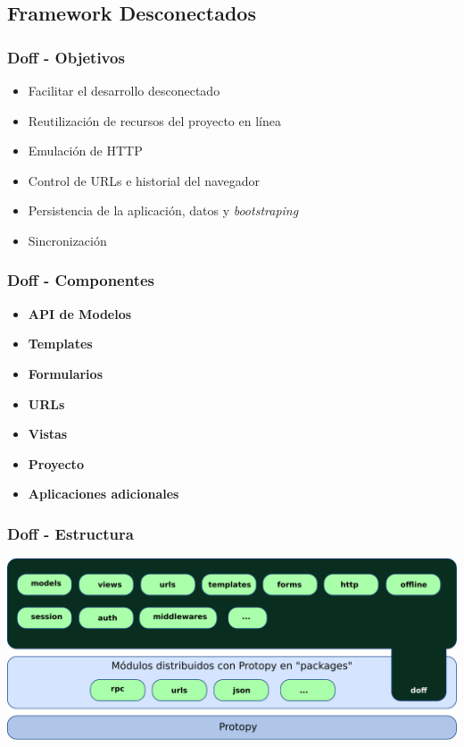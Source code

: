 \documentclass{beamer}
\begin{document}
\subsection{Framework Desconectados}
\begin{frame}
    \frametitle{Doff - Objetivos}
    \begin{itemize}
        \item{Facilitar el desarrollo desconectado}
        \item{Reutilización de recursos del proyecto en línea}
        \item{Emulación de HTTP}
        \item{Control de URLs e historial del navegador}
        \item{Persistencia de la aplicación, datos y {\it bootstraping}}
        \item{Sincronización}
        \end{itemize}
\end{frame}
    

\begin{frame}
    \frametitle{Doff - Componentes}
    \begin{itemize}
        \item {\bf API de Modelos }
        \item {\bf Templates }
        \item {\bf Formularios }
        \item {\bf URLs }
        \item {\bf Vistas }
        \item {\bf Proyecto }
        \item {\bf Aplicaciones adicionales }
    \end{itemize}
\end{frame}

\begin{frame}
    \frametitle{Doff - Estructura}
    \includegraphics[scale=0.5]{esquema_doff.pdf}
\end{frame}
\end{document}
